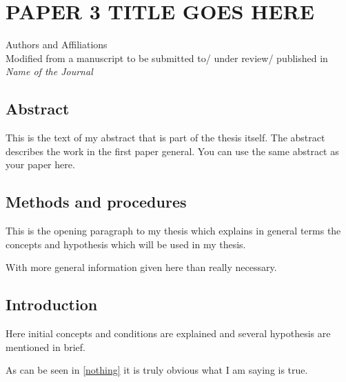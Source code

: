 \chapter{PAPER 3 TITLE GOES HERE}

\begin{center}
    Authors and Affiliations \\
    Modified from a manuscript to be submitted to/ under review/ published in \textit{Name of the Journal}
\end{center}

\section{Abstract}
This is the text of my abstract that is part of the thesis itself.
The abstract describes the work in the first paper general. You can use the same abstract as your paper here.



\section{Methods and procedures}

This is the opening paragraph to my thesis which
explains in general terms the concepts and hypothesis
which will be used in my thesis.

With more general information given here than really
necessary.

\section{Introduction}

Here initial concepts and conditions are explained and
several hypothesis are mentioned in brief.

As can be seen in \autoref{nothing} it is truly
obvious what I am saying is true.

